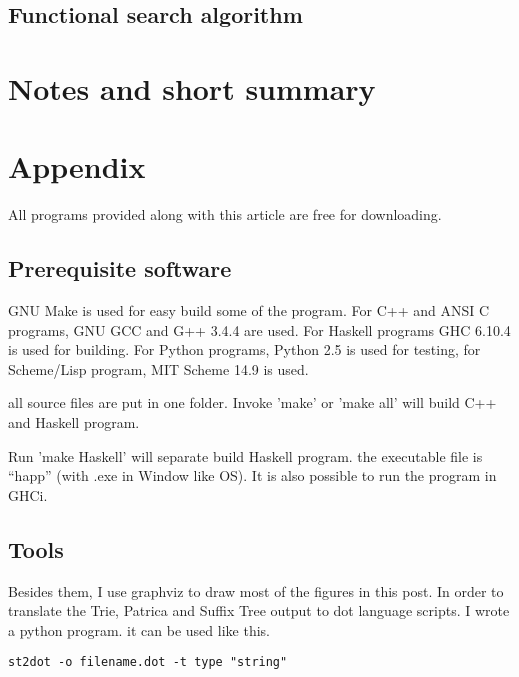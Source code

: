 \documentclass{article}
\begin{document}
\subsection{Functional search algorithm}

\section{Notes and short summary}


\section{Appendix} \label{appendix}
All programs provided along with this article are free for
downloading.

\subsection{Prerequisite software}
GNU Make is used for easy build some of the program. For C++ and ANSI C programs,
GNU GCC and G++ 3.4.4 are used. 
For Haskell programs GHC 6.10.4 is used
for building. For Python programs, Python 2.5 is used for testing, for
Scheme/Lisp program, MIT Scheme 14.9 is used.

all source files are put in one folder. Invoke 'make' or 'make all'
will build C++ and Haskell program. 

Run 'make Haskell' will separate build Haskell program. the executable
file is ``happ'' (with .exe
in Window like OS). It is also possible to run the program in GHCi.

\subsection{Tools}

Besides them, I use graphviz to draw most of the figures in this post. In order to
translate the Trie, Patrica and Suffix Tree output to dot language scripts. I wrote a python program.
it can be used like this.

\begin{verbatim}
st2dot -o filename.dot -t type "string"
\end{verbatim}
\end{document}
